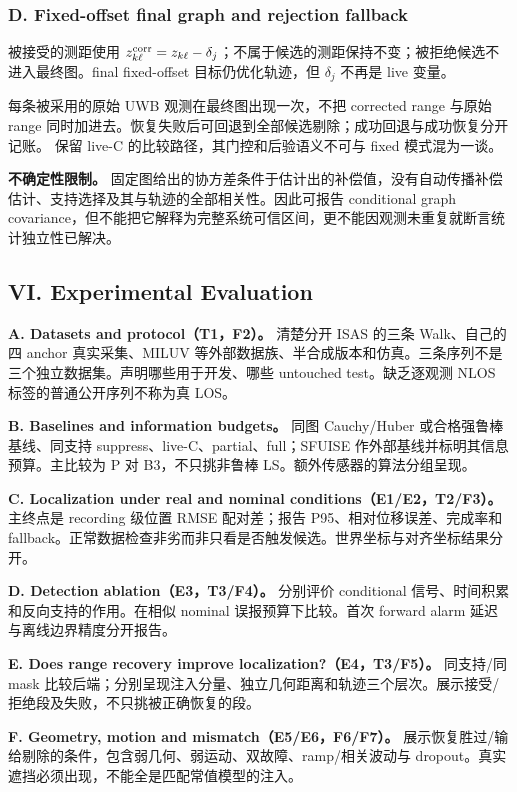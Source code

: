 \documentclass[UTF8,fontset=fandol,11pt,a4paper]{ctexart}
\newcommand{\code}[1]{\texttt{\detokenize{#1}}}
\begin{document}
\subsubsection{D. Fixed-offset final graph and rejection fallback}
被接受的测距使用 \(z^{\rm corr}_{k\ell}=z_{k\ell}-\delta_j\)；不属于候选的测距保持不变；被拒绝候选不进入最终图。final fixed-offset 目标仍优化轨迹，但 \(\delta_j\) 不再是 live 变量。

每条被采用的原始 UWB 观测在最终图出现一次，不把 corrected range 与原始 range 同时加进去。恢复失败后可回退到全部候选剔除；成功回退与成功恢复分开记账。\code{structured_debias} 保留 live-C 的比较路径，其门控和后验语义不可与 fixed 模式混为一谈。\cite{inference}

\textbf{不确定性限制。} 固定图给出的协方差条件于估计出的补偿值，没有自动传播补偿估计、支持选择及其与轨迹的全部相关性。因此可报告 conditional graph covariance，但不能把它解释为完整系统可信区间，更不能因观测未重复就断言统计独立性已解决。

\subsection{VI. Experimental Evaluation}

\textbf{A. Datasets and protocol（T1，F2）。} 清楚分开 ISAS 的三条 Walk、自己的四 anchor 真实采集、MILUV 等外部数据族、半合成版本和仿真。三条序列不是三个独立数据集。声明哪些用于开发、哪些 untouched test。缺乏逐观测 NLOS 标签的普通公开序列不称为真 LOS。\cite{sfuise,miluv,starloc}

\textbf{B. Baselines and information budgets。} 同图 Cauchy/Huber 或合格强鲁棒基线、同支持 suppress、live-C、partial、full；SFUISE 作外部基线并标明其信息预算。主比较为 P 对 B3，不只挑非鲁棒 LS。额外传感器的算法分组呈现。

\textbf{C. Localization under real and nominal conditions（E1/E2，T2/F3）。} 主终点是 recording 级位置 RMSE 配对差；报告 P95、相对位移误差、完成率和 fallback。正常数据检查非劣而非只看是否触发候选。世界坐标与对齐坐标结果分开。

\textbf{D. Detection ablation（E3，T3/F4）。} 分别评价 conditional 信号、时间积累和反向支持的作用。在相似 nominal 误报预算下比较。首次 forward alarm 延迟与离线边界精度分开报告。

\textbf{E. Does range recovery improve localization?（E4，T3/F5）。} 同支持/同 mask 比较后端；分别呈现注入分量、独立几何距离和轨迹三个层次。展示接受/拒绝段及失败，不只挑被正确恢复的段。

\textbf{F. Geometry, motion and mismatch（E5/E6，F6/F7）。} 展示恢复胜过/输给剔除的条件，包含弱几何、弱运动、双故障、ramp/相关波动与 dropout。真实遮挡必须出现，不能全是匹配常值模型的注入。
\end{document}
